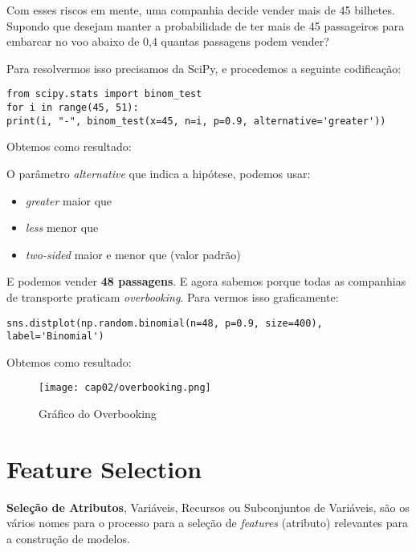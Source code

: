 Com esses riscos em mente, uma companhia decide vender mais de 45 bilhetes. Supondo que desejam manter a probabilidade de ter mais de 45 passageiros para embarcar no voo abaixo de 0,4 quantas passagens podem vender?

Para resolvermos isso precisamos da SciPy, e procedemos a seguinte codificação:
\begin{lstlisting}
from scipy.stats import binom_test
for i in range(45, 51):
print(i, "-", binom_test(x=45, n=i, p=0.9, alternative='greater'))
\end{lstlisting}

Obtemos como resultado: \\

O parâmetro \textit{alternative} que indica a hipótese, podemos usar: \vspace{-1em}
\begin{itemize}[nolistsep]
	\item \textit{greater} maior que
	\item \textit{less} menor que
	\item \textit{two-sided} maior e menor que (valor padrão)
\end{itemize}

E podemos vender \textbf{48 passagens}. E agora sabemos porque todas as companhias de transporte praticam \textit{overbooking}. Para vermos isso graficamente:
\begin{lstlisting}
sns.distplot(np.random.binomial(n=48, p=0.9, size=400), label='Binomial')
\end{lstlisting}

Obtemos como resultado:
\begin{figure}[H]
	\centering
	\texttt{[image: cap02/overbooking.png]}
	\caption{Gráfico do Overbooking}
\end{figure}

\section{Feature Selection}
\textbf{Seleção de Atributos}, Variáveis, Recursos ou Subconjuntos de Variáveis, são os vários nomes para o processo para a seleção de \textit{features} (atributo) relevantes para a construção de modelos. 

